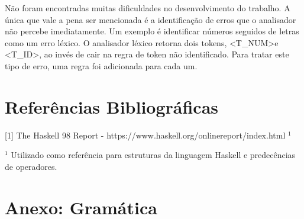 \documentclass[11pt]{article}
\begin{document}
Não foram encontradas muitas dificuldades no desenvolvimento do trabalho. A única que vale a pena
ser mencionada é a identificação de erros que o analisador não percebe imediatamente.
Um exemplo é identificar números seguidos de letras como um erro léxico. O analisador léxico retorna dois tokens,
\textless T\_NUM\textgreater e \textless T\_ID\textgreater, ao invés de cair na regra de token não identificado. Para tratar este tipo de erro, uma regra foi
adicionada para cada um.

\section{Referências Bibliográficas}
[1] The Haskell 98 Report - https://www.haskell.org/onlinereport/index.html $^1$

$^1$ Utilizado como referência para estruturas da linguagem Haskell e predecências de operadores.

\section{Anexo: Gramática}
\end{document}
